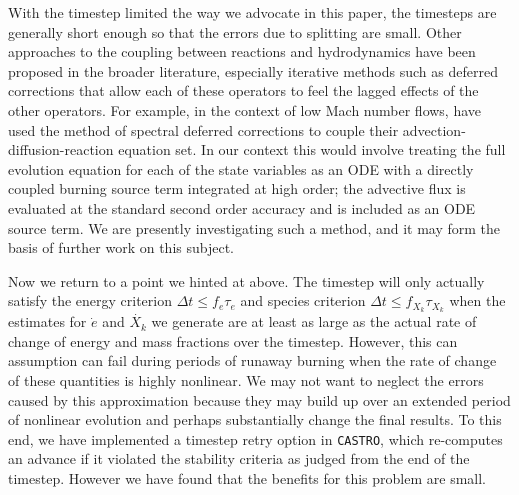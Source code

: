 \documentclass[twocolumn,numberedappendix]{../aastex6}
\newcommand{\castro}{\texttt{CASTRO}}
\begin{document}
With the timestep limited the way we advocate in this paper, 
the timesteps are generally short enough so that the errors 
due to splitting are small. Other approaches to the coupling 
between reactions and hydrodynamics have been proposed in the 
broader literature, especially iterative methods such as 
deferred corrections that allow each of these operators to 
feel the lagged effects of the other operators. For example,
in the context of low Mach number flows, \cite{nonaka:2012} have
used the method of spectral deferred corrections \citep{SDC} to
couple their advection-diffusion-reaction equation set. In our
context this would involve treating the full evolution equation
for each of the state variables as an ODE with a directly coupled
burning source term integrated at high order; the advective
flux is evaluated at the standard second order accuracy
and is included as an ODE source term.
We are presently investigating such a method,
and it may form the basis of further work on this subject.

Now we return to a point we hinted at above. The timestep
will only actually satisfy the energy criterion
$\Delta t \leq f_e \tau_e$ and species criterion
$\Delta t \leq f_{X_k} \tau_{X_k}$ when the estimates for
$\dot{e}$ and $\dot{X_k}$ we generate are at least as large
as the actual rate of change of energy and mass fractions
over the timestep. However, this can assumption can fail
during periods of runaway burning when the rate of change
of these quantities is highly nonlinear. We may not want
to neglect the errors caused by this approximation
because they may build up over an extended period of nonlinear
evolution and perhaps substantially change the final results.
To this end, we have implemented a timestep retry option in
\castro, which re-computes an advance if it violated the
stability criteria as judged from the end of the timestep.
However we have found that the benefits for this problem are
small.
\end{document}
